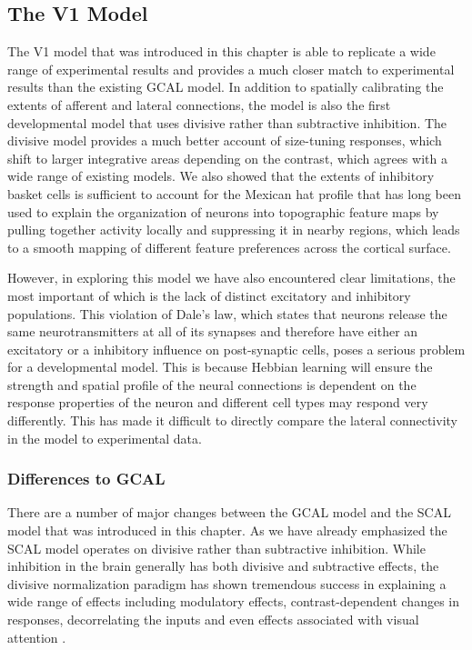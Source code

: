 \subsection{The V1 Model}

The V1 model that was introduced in this chapter is able to replicate
a wide range of experimental results and provides a much closer match
to experimental results than the existing GCAL model. In addition to
spatially calibrating the extents of afferent and lateral connections,
the model is also the first developmental model that uses divisive
rather than subtractive inhibition. The divisive model provides a much
better account of size-tuning responses, which shift to larger
integrative areas depending on the contrast, which agrees with a wide
range of existing models. We also showed that the extents of
inhibitory basket cells is sufficient to account for the Mexican hat
profile that has long been used to explain the organization of neurons
into topographic feature maps by pulling together activity locally and
suppressing it in nearby regions, which leads to a smooth mapping of
different feature preferences across the cortical surface.

However, in exploring this model we have also encountered clear
limitations, the most important of which is the lack of distinct
excitatory and inhibitory populations. This violation of Dale's law,
which states that neurons release the same neurotransmitters at all of
its synapses and therefore have either an excitatory or a inhibitory
influence on post-synaptic cells, poses a serious problem for a
developmental model. This is because Hebbian learning will ensure the
strength and spatial profile of the neural connections is dependent on
the response properties of the neuron and different cell types may
respond very differently. This has made it difficult to directly
compare the lateral connectivity in the model to experimental data.

\subsubsection*{Differences to GCAL}

There are a number of major changes between the GCAL model and the
SCAL model that was introduced in this chapter. As we have already
emphasized the SCAL model operates on divisive rather than subtractive
inhibition. While inhibition in the brain generally has both divisive
and subtractive effects, the divisive normalization paradigm has shown
tremendous success in explaining a wide range of effects including
modulatory effects, contrast-dependent changes in responses,
decorrelating the inputs and even effects associated with visual
attention \citep{Cavanaugh2002a, Graham2011, Carandini2012,
  Reynaud2012, Coen2015}.

